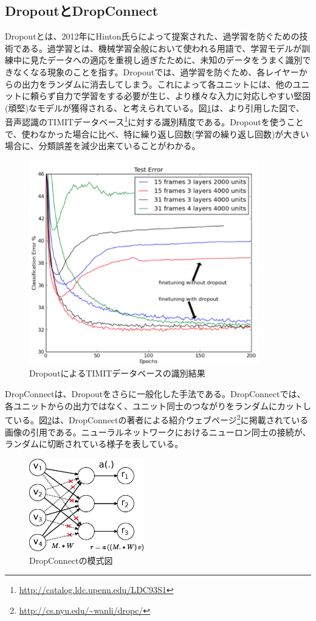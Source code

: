 \subsection{DropoutとDropConnect}
\label{c3_dropout}
Dropoutとは、2012年にHinton氏らによって提案された、過学習を防ぐための技術である\cite{hinton2012improving}。過学習とは、機械学習全般において使われる用語で、学習モデルが訓練中に見たデータへの適応を重視し過ぎたために、未知のデータをうまく識別できなくなる現象のことを指す。Dropoutでは、過学習を防ぐため、各レイヤーからの出力をランダムに消去してしまう。これによって各ユニットには、他のユニットに頼らず自力で学習をする必要が生じ、より様々な入力に対応しやすい堅固(頑堅)なモデルが獲得される、と考えられている。図\ref{c3_dropout_timit}は、\cite{hinton2012improving}より引用した図で、音声認識のTIMITデータベース\cite{fisher1986the-darpa}\footnote{\url{http://catalog.ldc.upenn.edu/LDC93S1}}に対する識別精度である。Dropoutを使うことで、使わなかった場合に比べ、特に繰り返し回数(学習の繰り返し回数)が大きい場合に、分類誤差を減少出来ていることがわかる。
\begin{figure}[tbp]
 \centering
  \includegraphics[width=100mm]{img/c3/dropout_timit}
 \caption{DropoutによるTIMITデータベースの識別結果}
 \label{c3_dropout_timit}
\end{figure}
\par
DropConnectは、Dropoutをさらに一般化した手法である。DropConnectでは、各ユニットからの出力ではなく、ユニット同士のつながりをランダムにカットしている。図\ref{c3_dropconnect}は、DropConnectの著者による紹介ウェブページ\footnote{\url{http://cs.nyu.edu/~wanli/dropc/}}に掲載されている画像の引用である。ニューラルネットワークにおけるニューロン同士の接続が、ランダムに切断されている様子を表している。
\begin{figure}[tbp]
 \begin{center}
  \includegraphics[width=50mm]{img/c3/nn_dc}
 \end{center}
 \caption{DropConnectの模式図}
 \label{c3_dropconnect}
\end{figure}

